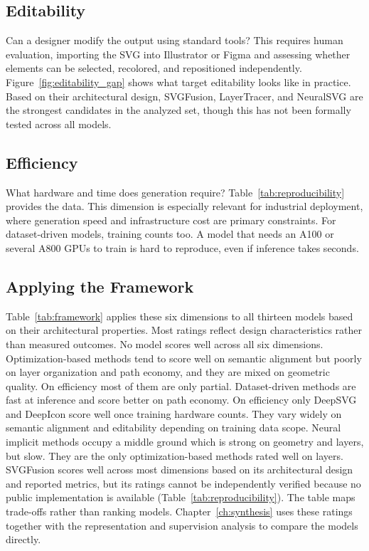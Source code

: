 \subsection{Editability}
Can a designer modify the 
output using standard tools? This requires human 
evaluation, importing the SVG into Illustrator 
or Figma and assessing whether elements can be 
selected, recolored, and repositioned independently. 
Figure~\ref{fig:editability_gap} shows what 
target editability looks like in practice. Based on 
their architectural design, SVGFusion, LayerTracer, 
and NeuralSVG are the strongest candidates in the 
analyzed set, though this has not been formally 
tested across all models.

\subsection{Efficiency}
What hardware and time does 
generation require? Table~\ref{tab:reproducibility} 
provides the data. This dimension is especially 
relevant for industrial deployment, where generation 
speed and infrastructure cost are primary constraints. 
For dataset-driven models, training counts too. A model 
that needs an A100 or several A800 GPUs to train is hard 
to reproduce, even if inference takes seconds.

\subsection{Applying the Framework}

Table~\ref{tab:framework} applies these six dimensions 
to all thirteen models based on their architectural 
properties. Most ratings reflect design characteristics 
rather than measured outcomes. No model scores well across all six dimensions. 
Optimization-based methods tend to score well on 
semantic alignment but poorly on layer organization 
and path economy, and they are mixed on geometric quality. 
On efficiency most of them are only partial. 
Dataset-driven methods are fast at inference and score 
better on path economy. On efficiency only DeepSVG and 
DeepIcon score well once training hardware counts. They 
vary widely on semantic alignment and editability 
depending on training data scope. 
Neural implicit methods occupy a middle ground which is 
strong on geometry and layers, but slow. They are the only 
optimization-based methods rated well on layers. SVGFusion scores 
well across most dimensions based on its 
architectural design and reported metrics, but its ratings 
cannot be independently verified because no public 
implementation is available 
(Table~\ref{tab:reproducibility}).
The table maps trade-offs rather than ranking models. 
Chapter~\ref{ch:synthesis} uses these ratings together with the 
representation and supervision analysis to compare the models directly.



